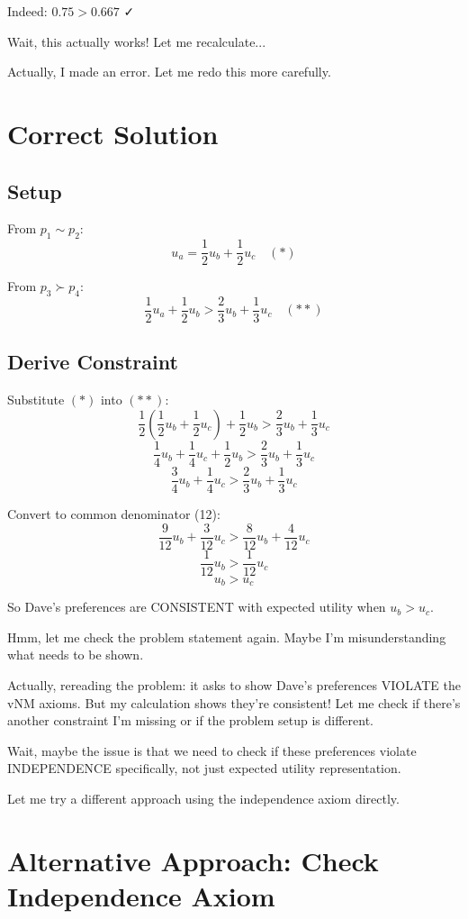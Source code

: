 \documentclass[11pt]{article}
\begin{document}
Indeed: $0.75 > 0.667$ ✓

Wait, this actually works! Let me recalculate...

Actually, I made an error. Let me redo this more carefully.

\section{Correct Solution}

\subsection{Setup}

From $p_1 \sim p_2$:
$$u_a = \frac{1}{2}u_b + \frac{1}{2}u_c \quad (*)$$

From $p_3 \succ p_4$:
$$\frac{1}{2}u_a + \frac{1}{2}u_b > \frac{2}{3}u_b + \frac{1}{3}u_c \quad (**)$$

\subsection{Derive Constraint}

Substitute $(*)$ into $(**)$:
$$\frac{1}{2}\left(\frac{1}{2}u_b + \frac{1}{2}u_c\right) + \frac{1}{2}u_b > \frac{2}{3}u_b + \frac{1}{3}u_c$$
$$\frac{1}{4}u_b + \frac{1}{4}u_c + \frac{1}{2}u_b > \frac{2}{3}u_b + \frac{1}{3}u_c$$
$$\frac{3}{4}u_b + \frac{1}{4}u_c > \frac{2}{3}u_b + \frac{1}{3}u_c$$

Convert to common denominator (12):
$$\frac{9}{12}u_b + \frac{3}{12}u_c > \frac{8}{12}u_b + \frac{4}{12}u_c$$
$$\frac{1}{12}u_b > \frac{1}{12}u_c$$
$$u_b > u_c$$

So Dave's preferences are CONSISTENT with expected utility when $u_b > u_c$.

Hmm, let me check the problem statement again. Maybe I'm misunderstanding what needs to be shown.

Actually, rereading the problem: it asks to show Dave's preferences VIOLATE the vNM axioms. But my calculation shows they're consistent! Let me check if there's another constraint I'm missing or if the problem setup is different.

Wait, maybe the issue is that we need to check if these preferences violate INDEPENDENCE specifically, not just expected utility representation.

Let me try a different approach using the independence axiom directly.

\section{Alternative Approach: Check Independence Axiom}
\end{document}
